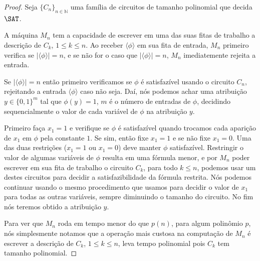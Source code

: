 \begin{proof}

\hfill

Seja $\{C_{n}\}_{n \in \mathbb{N}}$ uma família de circuitos de tamanho polinomial que decida $\SAT$.

A máquina $M_{n}$ tem a capacidade de escrever em uma das suas fitas de trabalho a descrição de $C_{k}$, $1 \leq k \leq n$. Ao receber $\langle \phi \rangle$ em sua fita de entrada, $M_{n}$ primeiro verifica se $\lvert \langle \phi \rangle \rvert = n$, e se não for o caso que $\lvert \langle \phi \rangle \rvert = n$, $M_{n}$ imediatemente rejeita a entrada.

Se $\lvert \langle \phi \rangle \rvert = n$ então primeiro verificamos se $\phi$ é satisfazível usando o circuito $C_{n}$, rejeitando a entrada $\langle \phi \rangle$ caso não seja. Daí, nós podemos achar uma atribuição $y \in \{0, 1\}^{m}$ tal que $\phi(y) = 1$, $m$ é o número de entradas de $\phi$, decidindo sequencialmente o valor de cada variável de $\phi$ na atribuição $y$.

Primeiro faça $x_{1} = 1$ e verifique se $\phi$ é satisfazível quando trocamos cada aparição de $x_{1}$ em $\phi$ pela constante $1$. Se sim, então fixe $x_{1} = 1$ e se não fixe $x_{1} = 0$. Uma das duas restrições ($x_{1} = 1$ ou $x_{1} = 0$) deve manter $\phi$ satisfazível. Restringir o valor de algumas variáveis de $\phi$ resulta em uma fórmula menor, e por $M_{n}$ poder escrever em sua fita de trabalho o circuito $C_{k}$, para todo $k \leq n$, podemos usar um destes circuitos para decidir a satisfazibilidade da fórmula restrita. Nós podemos continuar usando o mesmo procedimento que usamos para decidir o valor de $x_{1}$ para todas as outras variáveis, sempre diminuindo o tamanho do circuito. No fim nós teremos obtido a atribuição $y$.


Para ver que $M_{n}$ roda em tempo menor do que $p(n)$, para algum polinômio $p$, nós simplesmente notamos que a operação mais custosa na computação de $M_{n}$ é escrever a descrição de $C_{k}$, $1 \leq k \leq n$, leva tempo polinomial pois $C_{k}$ tem tamanho polinomial.

\end{proof}

